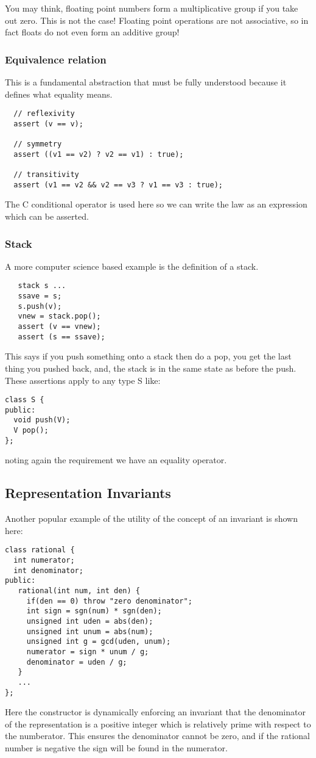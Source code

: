 \documentclass[oneside]{book}
\begin{document}
You may think, floating point numbers form a multiplicative group
if you take out zero. This is not the case! Floating point operations
are not associative, so in fact floats do not even form an additive group!


\subsubsection{Equivalence relation}
This is a fundamental abstraction that must be fully understood
because it defines what equality means.

\begin{verbatim}
  // reflexivity
  assert (v == v);

  // symmetry 
  assert ((v1 == v2) ? v2 == v1) : true);

  // transitivity
  assert (v1 == v2 && v2 == v3 ? v1 == v3 : true);
\end{verbatim}

The C conditional operator is used here so we can write the law
as an expression which can be asserted.


\subsubsection{Stack}
A more computer science based example is the definition of a stack.

\begin{verbatim}
   stack s ...
   ssave = s;
   s.push(v);
   vnew = stack.pop();
   assert (v == vnew);
   assert (s == ssave);
\end{verbatim}

This says if you push something onto a stack then do a pop, you get
the last thing you pushed back, and, the stack is in the same state
as before the push.  These assertions apply to any type S like:

\begin{verbatim}
class S {
public:
  void push(V);
  V pop();
};
\end{verbatim}

noting again the requirement we have an equality operator.

\subsection{Representation Invariants}
Another popular example of the utility of the concept of an invariant
is shown here:
\begin{verbatim}
class rational {
  int numerator;
  int denominator;
public:
   rational(int num, int den) {
     if(den == 0) throw "zero denominator";
     int sign = sgn(num) * sgn(den);
     unsigned int uden = abs(den);
     unsigned int unum = abs(num);
     unsigned int g = gcd(uden, unum);
     numerator = sign * unum / g;
     denominator = uden / g;
   }
   ...
};
\end{verbatim}
Here the constructor is dynamically enforcing an invariant that
the denominator of the representation is a positive integer
which is relatively prime with respect to the numberator.
This ensures the denominator cannot be zero, and if the rational
number is negative the sign will be found in the numerator.
\end{document}
